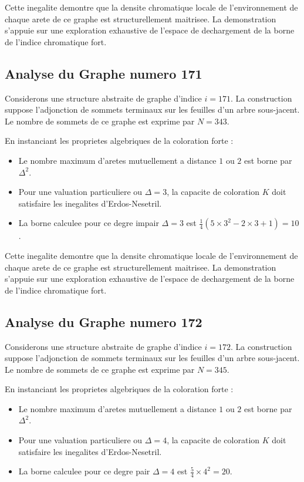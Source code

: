 \documentclass[11pt,a4paper]{article}
\begin{document}
Cette inegalite demontre que la densite chromatique locale de l'environnement de chaque arete de ce graphe est structurellement maitrisee. La demonstration s'appuie sur une exploration exhaustive de l'espace de dechargement de la borne de l'indice chromatique fort.

\subsection{Analyse du Graphe numero 171}
Considerons une structure abstraite de graphe d'indice $i = 171$. La construction suppose l'adjonction de sommets terminaux sur les feuilles d'un arbre sous-jacent. Le nombre de sommets de ce graphe est exprime par $N = 343$.

En instanciant les proprietes algebriques de la coloration forte :
\begin{itemize}
\item Le nombre maximum d'aretes mutuellement a distance $1$ ou $2$ est borne par $\Delta^2$.
\item Pour une valuation particuliere ou $\Delta = 3$, la capacite de coloration $K$ doit satisfaire les inegalites d'Erdos-Nesetril.
\item La borne calculee pour ce degre impair $\Delta = 3$ est $\frac{1}{4}(5 \times 3^2 - 2 \times 3 + 1) = 10$.
\end{itemize}

Cette inegalite demontre que la densite chromatique locale de l'environnement de chaque arete de ce graphe est structurellement maitrisee. La demonstration s'appuie sur une exploration exhaustive de l'espace de dechargement de la borne de l'indice chromatique fort.

\subsection{Analyse du Graphe numero 172}
Considerons une structure abstraite de graphe d'indice $i = 172$. La construction suppose l'adjonction de sommets terminaux sur les feuilles d'un arbre sous-jacent. Le nombre de sommets de ce graphe est exprime par $N = 345$.

En instanciant les proprietes algebriques de la coloration forte :
\begin{itemize}
\item Le nombre maximum d'aretes mutuellement a distance $1$ ou $2$ est borne par $\Delta^2$.
\item Pour une valuation particuliere ou $\Delta = 4$, la capacite de coloration $K$ doit satisfaire les inegalites d'Erdos-Nesetril.
\item La borne calculee pour ce degre pair $\Delta = 4$ est $\frac{5}{4} \times 4^2 = 20$.
\end{itemize}
\end{document}
